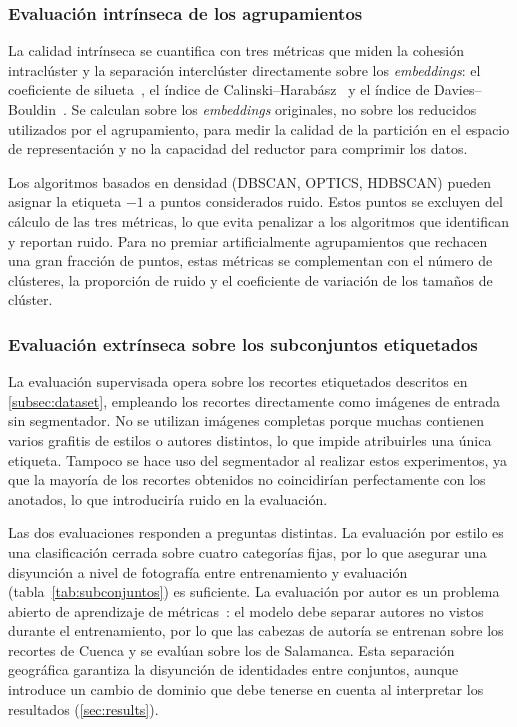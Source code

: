 \subsubsection{Evaluación intrínseca de los agrupamientos}
\label{subsubsec:eval-intrinseca}
La calidad intrínseca se cuantifica con tres métricas que miden la cohesión
intraclúster y la separación interclúster directamente sobre los
\textit{embeddings}: el coeficiente de silueta~\cite{rousseeuw_silhouettes_1987},
el índice de Calinski--Harabász~\cite{calinski_dendrite_1974} y el índice de
Davies--Bouldin~\cite{davies_cluster_1979}. Se calculan sobre los
\textit{embeddings} originales, no sobre los reducidos utilizados por el
agrupamiento, para medir la calidad de la partición en el espacio de
representación y no la capacidad del reductor para comprimir los datos.

Los algoritmos basados en densidad (DBSCAN, OPTICS, HDBSCAN) pueden asignar la
etiqueta $-1$ a puntos considerados ruido. Estos puntos se excluyen del cálculo
de las tres métricas, lo que evita penalizar a los algoritmos que identifican y
reportan ruido. Para no premiar artificialmente agrupamientos que rechacen una
gran fracción de puntos, estas métricas se complementan con el número de
clústeres, la proporción de ruido y el coeficiente de variación de los tamaños
de clúster.

\subsubsection{Evaluación extrínseca sobre los subconjuntos etiquetados}
\label{subsubsec:eval-extrinseca}
La evaluación supervisada opera sobre los recortes etiquetados descritos en
\ref{subsec:dataset}, empleando los recortes directamente como imágenes de
entrada sin segmentador. No se utilizan imágenes completas porque muchas
contienen varios grafitis de estilos o autores distintos, lo que impide
atribuirles una única etiqueta. Tampoco se hace uso del segmentador al realizar
estos experimentos, ya que la mayoría de los recortes obtenidos no coincidirían
perfectamente con los anotados, lo que introduciría ruido en la evaluación.

Las dos evaluaciones responden a preguntas distintas. La evaluación por estilo
es una clasificación cerrada sobre cuatro categorías fijas, por lo que asegurar
una disyunción a nivel de fotografía entre entrenamiento y evaluación
(tabla~\ref{tab:subconjuntos}) es suficiente. La evaluación por autor es un
problema abierto de aprendizaje de métricas~\cite{schroff_facenet_2015}: el
modelo debe separar autores no vistos durante el entrenamiento, por lo que las
cabezas de autoría se entrenan sobre los recortes de Cuenca y se evalúan sobre
los de Salamanca. Esta separación geográfica garantiza la disyunción de
identidades entre conjuntos, aunque introduce un cambio de dominio que debe
tenerse en cuenta al interpretar los resultados (\ref{sec:results}).

